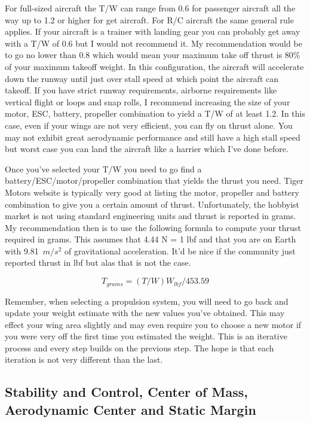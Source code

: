 \documentclass{article}
\def\beq{\begin{equation}}
\def\eeq{\end{equation}}
\begin{document}
For full-sized aircraft the T/W can range from 0.6 for passenger
aircraft all the way up to 1.2 or higher for get aircraft. For R/C
aircraft the same general rule applies. If your aircraft is a trainer
with landing gear you can probably get away with a T/W of 0.6 but I
would not recommend it. My recommendation would be to go no lower than
0.8 which would mean your maximum take off thrust is 80\% of your
maximum takeoff weight. In this configuration, the aircraft will
accelerate down the runway until just over stall speed at which point
the aircraft can takeoff. If you have strict runway requirements,
airborne requirements like vertical flight or loops and snap rolls, I
recommend increasing the size of your motor, ESC, battery, propeller
combination to yield a T/W of at least 1.2. In this case, even if your
wings are not very efficient, you can fly on thrust alone. You may not
exhibit great aerodynamic performance and still have a high stall
speed but worst case you can land the aircraft like a harrier which
I've done before.

Once you've selected your T/W you need to go find a
battery/ESC/motor/propeller combination that yields the thrust you
need. Tiger Motors website is typically very good at listing the
motor, propeller and battery combination to give you a certain amount
of thrust. Unfortunately, the hobbyist market is not using standard
engineering units and thrust is reported in grams. My recommendation
then is to use the following formula to compute your thrust required
in grams. This assumes that 4.44 N = 1 lbf and that you are on Earth
with 9.81~$m/s^2$ of gravitational acceleration. It'd be nice if the
community just reported thrust in lbf but alas that is not the case. 

\beq
T_{grams} = (T/W)W_{lbf}/453.59
\eeq

Remember, when selecting a propulsion system, you will need to go back
and update your weight estimate with the new values you've
obtained. This may effect your wing area slightly and may even require
you to choose a new motor if you were very off the first time you
estimated the weight. This is an iterative process and every step
builds on the previous step. The hope is that each iteration is not
very different than the last. 

\subsection{Stability and Control, Center of Mass, Aerodynamic Center and Static Margin}
\end{document}
